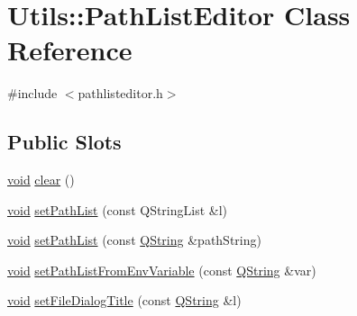 \hypertarget{class_utils_1_1_path_list_editor}{\section{\-Utils\-:\-:\-Path\-List\-Editor \-Class \-Reference}
\label{class_utils_1_1_path_list_editor}
}


{\ttfamily \#include $<$pathlisteditor.\-h$>$}

\subsection*{\-Public \-Slots}
\begin{DoxyCompactItemize}
\item 
\hyperlink{group___u_a_v_objects_plugin_ga444cf2ff3f0ecbe028adce838d373f5c}{void} \hyperlink{class_utils_1_1_path_list_editor_af6cfc8d39c245493fe352dcb05e7fafc}{clear} ()
\item 
\hyperlink{group___u_a_v_objects_plugin_ga444cf2ff3f0ecbe028adce838d373f5c}{void} \hyperlink{class_utils_1_1_path_list_editor_a18015673d52b80b875628c2b66d4db24}{set\-Path\-List} (const \-Q\-String\-List \&l)
\item 
\hyperlink{group___u_a_v_objects_plugin_ga444cf2ff3f0ecbe028adce838d373f5c}{void} \hyperlink{class_utils_1_1_path_list_editor_aed361e69b7808c9e39a3c11d00feda03}{set\-Path\-List} (const \hyperlink{group___u_a_v_objects_plugin_gab9d252f49c333c94a72f97ce3105a32d}{\-Q\-String} \&path\-String)
\item 
\hyperlink{group___u_a_v_objects_plugin_ga444cf2ff3f0ecbe028adce838d373f5c}{void} \hyperlink{class_utils_1_1_path_list_editor_a5126b279700cc6799220c53681ccc5fa}{set\-Path\-List\-From\-Env\-Variable} (const \hyperlink{group___u_a_v_objects_plugin_gab9d252f49c333c94a72f97ce3105a32d}{\-Q\-String} \&var)
\item 
\hyperlink{group___u_a_v_objects_plugin_ga444cf2ff3f0ecbe028adce838d373f5c}{void} \hyperlink{class_utils_1_1_path_list_editor_ac6942cbe78b6f8df818f21ed565e347c}{set\-File\-Dialog\-Title} (const \hyperlink{group___u_a_v_objects_plugin_gab9d252f49c333c94a72f97ce3105a32d}{\-Q\-String} \&l)
\end{DoxyCompactItemize}
